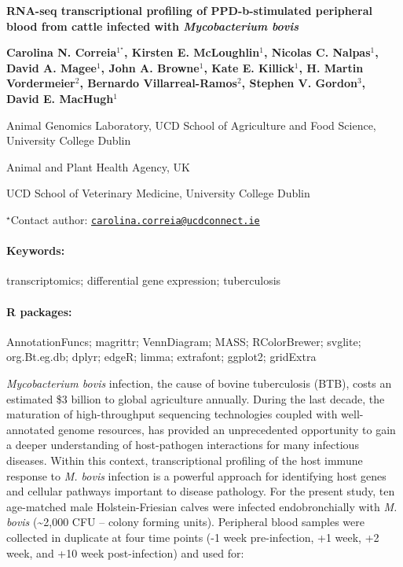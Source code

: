 \documentclass[11pt, a4paper]{article}
\renewcommand{\title}[1]{\begin{center}{\bf \LARGE #1}\end{center}}
\newcommand{\keywords}{\paragraph{Keywords:}}
\newcommand{\packages}{\paragraph{R packages:}}
\begin{document}
\pagestyle{empty}

\title{RNA-seq transcriptional profiling of PPD-b-stimulated peripheral blood
from cattle infected with \emph{Mycobacterium bovis}}

\begin{center}
  {\bf Carolina N. Correia$^{1^\star}$, Kirsten E. McLoughlin$^{1}$, Nicolas C. Nalpas$^{1}$, David A. Magee$^{1}$, John A. Browne$^{1}$, Kate E. Killick$^{1}$, H. Martin Vordermeier$^{2}$, Bernardo Villarreal-Ramos$^{2}$, Stephen V. Gordon$^{3}$, David E. MacHugh$^{1}$}
\end{center}

\vskip 0.3cm

\begin{affiliations}
\begin{enumerate}
\begin{minipage}{0.915\textwidth}
\centering
\item Animal Genomics Laboratory, UCD School of Agriculture and Food Science,
University College Dublin \\[-2pt]
\item Animal and Plant Health Agency, UK \\[-2pt]
\item UCD School of Veterinary Medicine, University College Dublin \\[-2pt]
\end{minipage}
\end{enumerate}
$^\star$Contact author: \href{mailto:carolina.correia@ucdconnect.ie}{\nolinkurl{carolina.correia@ucdconnect.ie}}\\
\end{affiliations}

\vskip 0.5cm

\begin{minipage}{0.915\textwidth}
\keywords transcriptomics; differential gene expression; tuberculosis
\packages AnnotationFuncs; magrittr; VennDiagram; MASS; RColorBrewer; svglite;
org.Bt.eg.db; dplyr; edgeR; limma; extrafont; ggplot2; gridExtra
\end{minipage}

\vskip 0.8cm

\emph{Mycobacterium bovis} infection, the cause of bovine tuberculosis
(BTB), costs an estimated \$3 billion to global agriculture annually.
During the last decade, the maturation of high-throughput sequencing
technologies coupled with well-annotated genome resources, has provided
an unprecedented opportunity to gain a deeper understanding of
host-pathogen interactions for many infectious diseases. Within this
context, transcriptional profiling of the host immune response to
\emph{M. bovis} infection is a powerful approach for identifying host
genes and cellular pathways important to disease pathology. For the
present study, ten age-matched male Holstein-Friesian calves were
infected endobronchially with \emph{M. bovis} (\textasciitilde{}2,000
CFU -- colony forming units). Peripheral blood samples were collected in
duplicate at four time points (-1 week pre-infection, +1 week, +2 week,
and +10 week post-infection) and used for:
\end{document}
